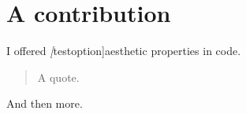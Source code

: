 

\section{A contribution}

I offered \emph[testoption]{aesthetic properties} in code.

\begin{quote}
    A quote.
\end{quote}

And then more.

